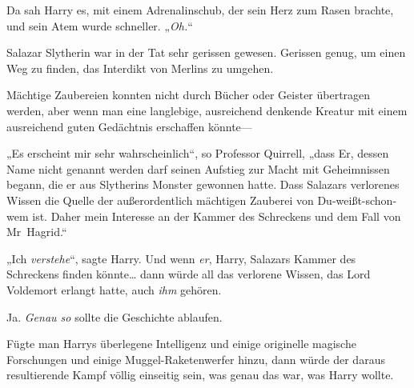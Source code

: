 Da sah Harry es, mit einem Adrenalinschub, der sein Herz zum Rasen brachte, und sein Atem wurde schneller. „\emph{Oh.}“

Salazar Slytherin war in der Tat sehr gerissen gewesen. Gerissen genug, um einen Weg zu finden, das Interdikt von Merlins zu umgehen.

Mächtige Zaubereien konnten nicht durch Bücher oder Geister übertragen werden, aber wenn man eine langlebige, ausreichend denkende Kreatur mit einem ausreichend guten Gedächtnis erschaffen könnte—

„Es erscheint mir sehr wahrscheinlich“, so Professor Quirrell, „dass Er, dessen Name nicht genannt werden darf seinen Aufstieg zur Macht mit Geheimnissen begann, die er aus Slytherins Monster gewonnen hatte. Dass Salazars verlorenes Wissen die Quelle der außerordentlich mächtigen Zauberei von Du-weißt-schon-wem ist. Daher mein Interesse an der Kammer des Schreckens und dem Fall von Mr~Hagrid.“

„Ich \emph{verstehe}“, sagte Harry. Und wenn \emph{er}, Harry, Salazars Kammer des Schreckens finden könnte… dann würde all das verlorene Wissen, das Lord Voldemort erlangt hatte, auch \emph{ihm} gehören.

Ja. \emph{Genau so} sollte die Geschichte ablaufen.

Fügte man Harrys überlegene Intelligenz und einige originelle magische Forschungen und einige Muggel-Raketenwerfer hinzu, dann würde der daraus resultierende Kampf völlig einseitig sein, was genau das war, was Harry wollte.

